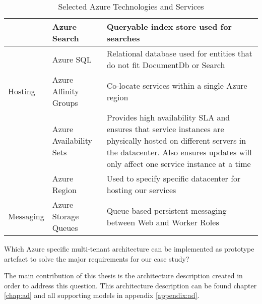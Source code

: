 \begin{table}[htp]
\begin{tabularx}{\textwidth}{|p{1.9cm}|p{3cm}|X|}
               & Azure Search            & Queryable index store used for searches                                                                                                                                                               \\\hline
               & Azure SQL               & Relational database used for entities that do not fit DocumentDb or Search                                                                                                                            \\\hline
Hosting        & Azure Affinity Groups   & Co-locate services within a single Azure region                                                                                                                                                       \\\hline
               & Azure Availability Sets & Provides high availability SLA and ensures that service instances are physically hosted on different servers in the datacenter. Also ensures updates will only affect one service instance at a time \\\hline
               & Azure Region            & Used to specify specific datacenter for hosting our services                                                                                                                                          \\\hline
Messaging      & Azure Storage Queues    & Queue based persistent messaging between Web and Worker Roles                                                                                                                                         \\\hline                                                                      
\end{tabularx}
\caption{Selected Azure Technologies and Services}
\label{tab:technologiesselected}
\end{table}

\begin{tcolorbox}[title=Research Question 3]
Which Azure specific multi-tenant architecture can be implemented as prototype artefact to solve the major requirements for our case study?
\end{tcolorbox}


The main contribution of this thesis is the architecture description created in order to address this question. This architecture description can be found chapter \ref{chap:ad} and all supporting models in appendix \ref{appendix:ad}.

